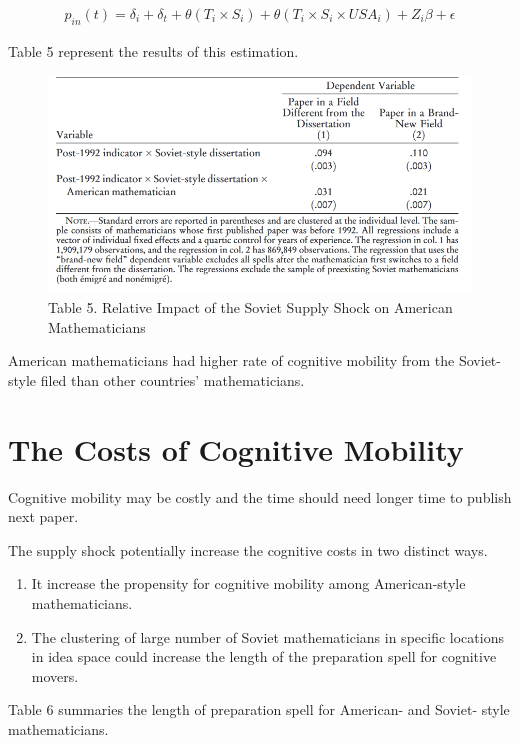 \documentclass[../root]{subfiles}
\begin{document}
    \begin{align}
        p_{in} (t) = \delta_i + \delta_t + \theta(T_i \times S_i) + \theta(T_i \times S_i \times USA_i) + Z_i \beta +\epsilon
    \end{align}
    
    Table 5 represent the results of this estimation.
    
    \begin{figure}
        \centering
        \includegraphics[width = \linewidth]{_images/0918sugiyama/Table_5.png}
        \caption{Table 5. Relative Impact of the Soviet Supply Shock on American Mathematicians}
        \label{fig:my_label}
    \end{figure}
    
    American mathematicians had higher rate of cognitive mobility from the Soviet-style filed than other countries' mathematicians.
    
    \section{The Costs of Cognitive Mobility}
    Cognitive mobility may be costly and the time should need longer time to publish next paper. 
    
    The supply shock potentially increase the cognitive costs in two distinct ways.
    \begin{enumerate}
        \item It increase the propensity for cognitive mobility among American-style mathematicians.
        \item The clustering of large number of Soviet mathematicians in specific locations in idea space could increase the length of the preparation spell for cognitive movers.
    \end{enumerate}
    Table 6 summaries the length of preparation spell for American- and Soviet- style mathematicians.
    
\end{document}
